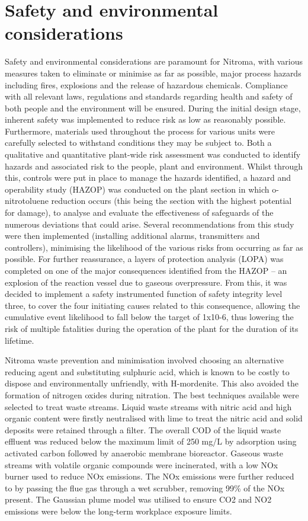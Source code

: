 \section*{Safety and environmental considerations}

Safety and environmental considerations are paramount for Nitroma, with various measures taken to eliminate or minimise as far as possible, major process hazards including fires, explosions and the release of hazardous chemicals. Compliance with all relevant laws, regulations and standards regarding health and safety of both people and the environment will be ensured.  During the initial design stage, inherent safety was implemented to reduce risk as low as reasonably possible. Furthermore, materials used throughout the process for various units were carefully selected to withstand conditions they may be subject to. Both a qualitative and quantitative plant-wide risk assessment was conducted to identify hazards and associated risk to the people, plant and environment. Whilst through this, controls were put in place to manage the hazards identified, a hazard and operability study (HAZOP) was conducted on the plant section in which o-nitrotoluene reduction occurs (this being the section with the highest potential for damage), to analyse and evaluate the effectiveness of safeguards of the numerous deviations that could arise. Several recommendations from this study were then implemented (installing additional alarms, transmitters and controllers), minimising the likelihood of the various risks from occurring as far as possible. For further reassurance, a layers of protection analysis (LOPA) was completed on one of the major consequences identified from the HAZOP – an explosion of the reaction vessel due to gaseous overpressure.  From this, it was decided to implement a safety instrumented function of safety integrity level three, to cover the four initiating causes related to this consequence, allowing the cumulative event likelihood to fall below the target of 1x10-6, thus lowering the risk of multiple fatalities during the operation of the plant for the duration of its lifetime. 

Nitroma waste prevention and minimisation involved choosing an alternative reducing agent and substituting sulphuric acid, which is known to be costly to dispose and environmentally unfriendly, with H-mordenite. This also avoided the formation of nitrogen oxides during nitration. The best techniques available were selected to treat waste streams. Liquid waste streams with nitric acid and high organic content were firstly neutralised with lime to treat the nitric acid and solid deposits were retained through a filter. The overall COD of the liquid waste effluent was reduced below the maximum limit of 250 mg/L by adsorption using activated carbon followed by anaerobic membrane bioreactor. Gaseous waste streams with volatile organic compounds were incinerated, with a low NOx burner used to reduce NOx emissions. The NOx emissions were further reduced to by passing the flue gas through a wet scrubber, removing 99\% of the NOx present. The Gaussian plume model was utilised to ensure CO2 and NO2 emissions were below the long-term workplace exposure limits.  

